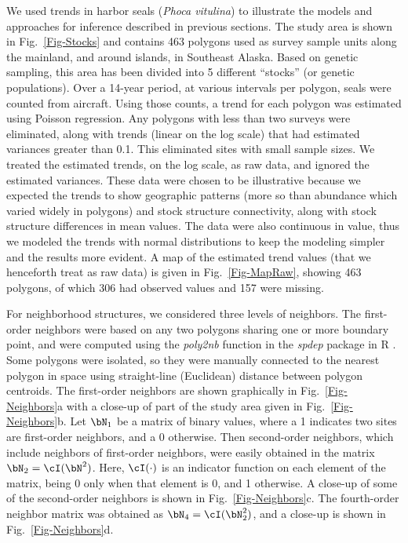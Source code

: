 We used trends in harbor seals (\emph{Phoca vitulina}) to illustrate the models and approaches for inference described in previous sections. The study area is shown in Fig.~\ref{Fig-Stocks} and contains 463 polygons used as survey sample units along the mainland, and around islands, in Southeast Alaska.  Based on genetic sampling, this area has been divided into 5 different ``stocks'' (or genetic populations). Over a 14-year period, at various intervals per polygon, seals were counted from aircraft.  Using those counts, a trend for each polygon was estimated using Poisson regression.  Any polygons with less than two surveys were eliminated, along with trends (linear on the log scale) that had estimated variances greater than 0.1.  This eliminated sites with small sample sizes.  We treated the estimated trends, on the log scale, as raw data, and ignored the estimated variances.  These data were chosen to be illustrative because we expected the trends to show geographic patterns (more so than abundance which varied widely in polygons) and stock structure connectivity, along with stock structure differences in mean values. The data were also continuous in value, thus we modeled the trends with normal distributions to keep the modeling simpler and the results more evident.  A map of the estimated trend values (that we henceforth treat as raw data) is given in Fig.~\ref{Fig-MapRaw}, showing 463 polygons, of which 306 had observed values and 157 were missing.

For neighborhood structures, we considered three levels of neighbors.  The first-order neighbors were based on any two polygons sharing one or more boundary point, and were computed using the \emph{poly2nb} function in the \emph{spdep} package \citep{Biva:Pira:comp:2015} in R \citep{R:Deve:Core:ALan:2016}. Some polygons were isolated, so they were manually connected to the nearest polygon in space using straight-line (Euclidean) distance between polygon centroids.  The first-order neighbors are shown graphically in Fig.~\ref{Fig-Neighbors}a with a close-up of part of the study area given in Fig.~\ref{Fig-Neighbors}b.  Let $\bN_1$ be a matrix of binary values, where a 1 indicates two sites are first-order neighbors, and a 0 otherwise. Then second-order neighbors, which include neighbors of first-order neighbors, were easily obtained in the matrix $\bN_2 = \cI(\bN^2)$. Here, $\cI(\cdot)$ is an indicator function on each element of the matrix, being 0 only when that element is 0, and 1 otherwise. A close-up of some of the second-order neighbors is shown in Fig.~\ref{Fig-Neighbors}c. The fourth-order neighbor matrix was obtained as $\bN_4 = \cI(\bN_2^2)$, and a close-up is shown in Fig.~\ref{Fig-Neighbors}d.

